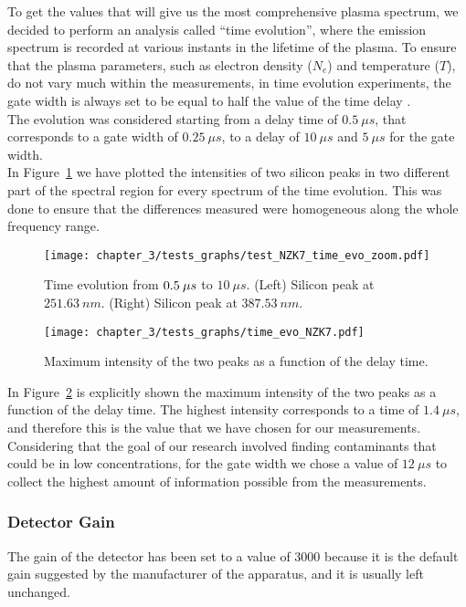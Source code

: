 To get the values that will give us the most comprehensive plasma spectrum, we decided to perform an analysis called “time evolution”, where the emission spectrum is recorded at various instants in the lifetime of the plasma. To ensure that the plasma parameters, such as electron density ($N_e$) and temperature ($T$), do not vary much within the measurements, in time evolution experiments, the gate width is always set to be equal to half the value of the time delay \cite{gerhardQuantitativeAnalysesGlass2014}.
\\
The evolution was considered starting from a delay time of $0.5\: \mu s$, that corresponds to a gate width of $0.25 \: \mu s$, to a delay of $10 \: \mu s$ and $5 \: \mu s$ for the gate width.
\\
In Figure~\ref{fig:test_NZK7_time_evo_zoom} we have plotted the intensities of two silicon peaks in two different part of the spectral region for every spectrum of the time evolution. This was done to ensure that the differences measured were homogeneous along the whole frequency range.
\begin{figure}[H]
    \centering
    \texttt{[image: chapter\_3/tests\_graphs/test\_NZK7\_time\_evo\_zoom.pdf]} 
    \vspace*{-30pt}
    \caption[Time evolution.]{Time evolution from $\protect 0.5\: \mu s$ to $10 \: \mu s$. (Left) Silicon peak at $251.63 \: nm$. (Right) Silicon peak at $387.53 \: nm$.}
    \label{fig:test_NZK7_time_evo_zoom}
 \end{figure}

 \begin{figure}[H]
    \centering
    \texttt{[image: chapter\_3/tests\_graphs/time\_evo\_NZK7.pdf]} 
    \vspace*{-30pt}
    \caption{Maximum intensity of the two peaks as a function of the delay time.}
    \label{fig:time_evo_NZK7}
 \end{figure}
In Figure~\ref{fig:time_evo_NZK7} is explicitly shown the maximum intensity of the two peaks as a function of the delay time. The highest intensity corresponds to a time of $1.4 \: \mu s$, and therefore this is the value that we have chosen for our measurements.
\\
Considering that the goal of our research involved finding contaminants that could be in low concentrations, for the gate width we chose a value of $12 \: \mu s$ to collect the highest amount of information possible from the measurements.

\subsubsection{Detector Gain}
\label{subsubsec:detector_gain}
The gain of the detector has been set to a value of 3000 because it is the default gain suggested by the manufacturer of the apparatus, and it is usually left unchanged.

